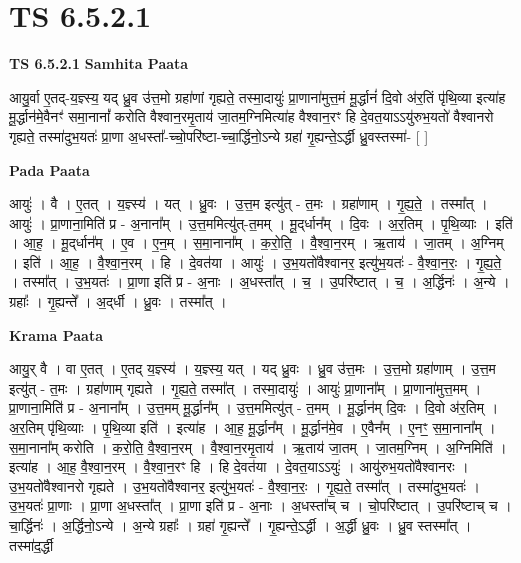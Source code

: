 \documentclass[17pt]{extarticle}
\begin{document}
\section{ TS 6.5.2.1 }

\textbf{TS 6.5.2.1 } \newline
\textbf{Samhita Paata} \newline

आयु॒र्वा ए॒तद्-य॒ज्ञ्स्य॒ यद् ध्रु॒व उ॑त्त॒मो ग्रहा॑णां गृह्यते॒ तस्मा॒दायुः॑ प्रा॒णाना॑मुत्त॒मं मू॒र्द्धानं॑ दि॒वो अ॑र॒तिं पृ॑थि॒व्या इत्या॑ह मू॒र्द्धान॑मे॒वैनꣳ॑ समा॒नानां᳚ करोति वैश्वान॒रमृ॒ताय॑ जा॒तम॒ग्निमित्या॑ह वैश्वान॒रꣳ हि दे॒वत॒याऽऽयु॑रुभ॒यतो॑ वैश्वानरो गृह्यते॒ तस्मा॑दुभ॒यतः॑ प्रा॒णा अ॒धस्ता᳚-च्चो॒परि॑ष्टा-च्चा॒र्द्धिनो॒ऽन्ये ग्रहा॑ गृ॒ह्यन्ते॒ऽर्द्धी ध्रु॒वस्तस्मा॑- [  ] \newline

\textbf{Pada Paata} \newline

आयुः॑ । वै । ए॒तत् । य॒ज्ञ्स्य॑ । यत् । ध्रु॒वः । उ॒त्त॒म इत्यु॑त् - त॒मः । ग्रहा॑णाम् । गृ॒ह्य॒ते॒ । तस्मा᳚त् । आयुः॑ । प्रा॒णाना॒मिति॑ प्र - अ॒नाना᳚म् । उ॒त्त॒ममित्यु॑त्-त॒मम् । मू॒द्‌र्धान᳚म् । दि॒वः । अ॒र॒तिम् । पृ॒थि॒व्याः । इति॑ । आ॒ह॒ । मू॒द्‌र्धान᳚म् । ए॒व । ए॒न॒म् । स॒मा॒नाना᳚म् । क॒रो॒ति॒ । वै॒श्वा॒न॒रम् । ऋ॒ताय॑ । जा॒तम् । अ॒ग्निम् । इति॑ । आ॒ह॒ । वै॒श्वा॒न॒रम् । हि । दे॒वत॑या । आयुः॑ । उ॒भ॒यतो॑वैश्वानर॒ इत्यु॑भ॒यतः॑ - वै॒श्वा॒न॒रः॒ । गृ॒ह्य॒ते॒ । तस्मा᳚त् । उ॒भ॒यतः॑ । प्रा॒णा इति॑ प्र - अ॒नाः । अ॒धस्ता᳚त् । च॒ । उ॒परि॑ष्टात् । च॒ । अ॒र्द्धिनः॑ । अ॒न्ये । ग्रहाः᳚ । गृ॒ह्यन्ते᳚ । अ॒द्‌र्धी । ध्रु॒वः । तस्मा᳚त् ।  \newline


\textbf{Krama Paata} \newline

आयु॒र् वै । वा ए॒तत् । ए॒तद् य॒ज्ञ्स्य॑ । य॒ज्ञ्स्य॒ यत् । यद् ध्रु॒वः । ध्रु॒व उ॑त्त॒मः । उ॒त्त॒मो ग्रहा॑णाम् । उ॒त्त॒म इत्यु॑त् - त॒मः । ग्रहा॑णाम् गृह्यते । गृ॒ह्य॒ते॒ तस्मा᳚त् । तस्मा॒दायुः॑ । आयुः॑ प्रा॒णाना᳚म् । प्रा॒णाना॑मुत्त॒मम् । प्रा॒णाना॒मिति॑ प्र - अ॒नाना᳚म् । उ॒त्त॒मम् मू॒र्द्धान᳚म् । उ॒त्त॒ममित्यु॑त् - त॒मम् । मू॒र्द्धान॑म् दि॒वः । दि॒वो अ॑र॒तिम् । अ॒र॒तिम् पृ॑थि॒व्याः । पृ॒थि॒व्या इति॑ । इत्या॑ह । आ॒ह॒ मू॒र्द्धान᳚म् । मू॒र्द्धान॑मे॒व । ए॒वैन᳚म् । ए॒नꣳ॒॒ स॒मा॒नाना᳚म् । स॒मा॒नाना᳚म् करोति । क॒रो॒ति॒ वै॒श्वा॒न॒रम् । वै॒श्वा॒न॒रमृ॒ताय॑ । ऋ॒ताय॑ जा॒तम् । जा॒तम॒ग्निम् । अ॒ग्निमिति॑ । इत्या॑ह । आ॒ह॒ वै॒श्वा॒न॒रम् । वै॒श्वा॒न॒रꣳ हि । हि दे॒वत॑या । दे॒वत॒याऽऽयुः॑ । आयु॑रुभ॒यतो॑वैश्वानरः । उ॒भ॒यतो॑वैश्वानरो गृह्यते । उ॒भ॒यतो॑वैश्वानर॒ इत्यु॑भ॒यतः॑ - वै॒श्वा॒न॒रः॒ । गृ॒ह्य॒ते॒ तस्मा᳚त् । तस्मा॑दुभ॒यतः॑ । उ॒भ॒यतः॑ प्रा॒णाः । प्रा॒णा अ॒धस्ता᳚त् । प्रा॒णा इति॑ प्र - अ॒नाः । अ॒धस्ता᳚च् च । चो॒परि॑ष्टात् । उ॒परि॑ष्टाच् च । चा॒र्द्धिनः॑ । अ॒र्द्धिनो॒ऽन्ये । अ॒न्ये ग्रहाः᳚ । ग्रहा॑ गृ॒ह्यन्ते᳚ । गृ॒ह्यन्ते॒ऽर्द्धी । अ॒र्द्धी ध्रु॒वः । ध्रु॒व स्तस्मा᳚त् । तस्मा॑द॒र्द्धी \newline
\end{document}
